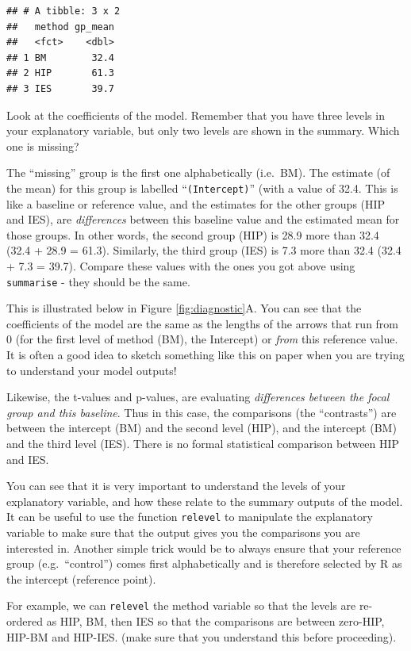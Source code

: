 \documentclass[
  a4paperpaper,
]{book}
\begin{document}
\begin{verbatim}
## # A tibble: 3 x 2
##   method gp_mean
##   <fct>    <dbl>
## 1 BM        32.4
## 2 HIP       61.3
## 3 IES       39.7
\end{verbatim}

Look at the coefficients of the model. Remember that you have three levels in your explanatory variable, but only two levels are shown in the summary. Which one is missing?

The ``missing'' group is the first one alphabetically (i.e.~BM). The estimate (of the mean) for this group is labelled ``\texttt{(Intercept)}'' (with a value of 32.4. This is like a baseline or reference value, and the estimates for the other groups (HIP and IES), are \emph{differences} between this baseline value and the estimated mean for those groups. In other words, the second group (HIP) is 28.9 more than 32.4 (32.4 + 28.9 = 61.3). Similarly, the third group (IES) is 7.3 more than 32.4 (32.4 + 7.3 = 39.7). Compare these values with the ones you got above using \texttt{summarise} - they should be the same.

This is illustrated below in Figure \ref{fig:diagnostic}A. You can see that the coefficients of the model are the same as the lengths of the arrows that run from 0 (for the first level of method (BM), the Intercept) or \emph{from} this reference value. It is often a good idea to sketch something like this on paper when you are trying to understand your model outputs!

Likewise, the t-values and p-values, are evaluating \emph{differences between the focal group and this baseline}. Thus in this case, the comparisons (the ``contrasts'') are between the intercept (BM) and the second level (HIP), and the intercept (BM) and the third level (IES). There is no formal statistical comparison between HIP and IES.

You can see that it is very important to understand the levels of your explanatory variable, and how these relate to the summary outputs of the model. It can be useful to use the function \texttt{relevel} to manipulate the explanatory variable to make sure that the output gives you the comparisons you are interested in. Another simple trick would be to always ensure that your reference group (e.g.~``control'') comes first alphabetically and is therefore selected by R as the intercept (reference point).

For example, we can \texttt{relevel} the method variable so that the levels are re-ordered as HIP, BM, then IES so that the comparisons are between zero-HIP, HIP-BM and HIP-IES. (make sure that you understand this before proceeding).
\end{document}
